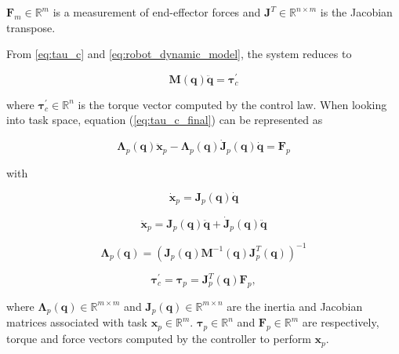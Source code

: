 $\boldsymbol{F}_m \in \mathbb{R}^m$ is a measurement of end-effector forces and $\boldsymbol{J}^T \in \mathbb{R}^{n\times m}$ is the Jacobian transpose.

From \ref{eq:tau_c} and \ref{eq:robot_dynamic_model}, the system reduces to

\begin{equation}
    \label{eq:tau_c_final}
    \boldsymbol{M}(\boldsymbol{q})\boldsymbol{\ddot{q}} = \boldsymbol{\tau}^\prime_c
\end{equation}

where $\boldsymbol{\tau}^\prime_c \in \mathbb{R}^n$ is the torque vector computed by the control law. When looking into task space, equation (\ref{eq:tau_c_final}) can be represented as \cite{Santos2018_computed_torque_control_robotic_assisted_tele_ecography}

\begin{equation}
    \label{eq:fp_lambdas}
    \boldsymbol{\Lambda}_p(\boldsymbol{q}) \boldsymbol{\ddot{x}}_p - \boldsymbol{\Lambda}_p(\boldsymbol{q}) \boldsymbol{\dot{J}}_p(\boldsymbol{q})\boldsymbol{\dot{q}} = \boldsymbol{F}_p    
\end{equation}

with

\begin{equation}
    \boldsymbol{\dot{x}}_p = \boldsymbol{J}_p(\boldsymbol{q})\boldsymbol{\dot{q}}
\end{equation}

\begin{equation}
    \boldsymbol{\ddot{x}}_p = \boldsymbol{J}_p(\boldsymbol{q})\boldsymbol{\ddot{q}} + \boldsymbol{\dot{J}}_p(\boldsymbol{q})\boldsymbol{\ddot{q}}
\end{equation}

\begin{equation}
    \boldsymbol{\Lambda}_p(\boldsymbol{q}) = (\boldsymbol{J}_p(\boldsymbol{q})\boldsymbol{M}^{-1}(\boldsymbol{q})\boldsymbol{J}^T_p(\boldsymbol{q}))^{-1}
\end{equation}

\begin{equation}
    \label{eq:tc_tp}
    \boldsymbol{\tau}^\prime_c = \boldsymbol{\tau}_p = \boldsymbol{J}^T_p(\boldsymbol{q})\boldsymbol{F}_p,
\end{equation}

where $\boldsymbol{\Lambda}_p(\boldsymbol{q}) \in \mathbb{R}^{m\times m}$ and $\boldsymbol{J}_p(\boldsymbol{q}) \in \mathbb{R}^{m\times n}$ are the inertia and Jacobian matrices associated with task $\boldsymbol{x}_p \in \mathbb{R}^m$. $\boldsymbol{\tau}_p \in \mathbb{R}^n$ and $\boldsymbol{F}_p \in \mathbb{R}^m$ are respectively, torque and force vectors computed by the controller to perform $\boldsymbol{x}_p$.

